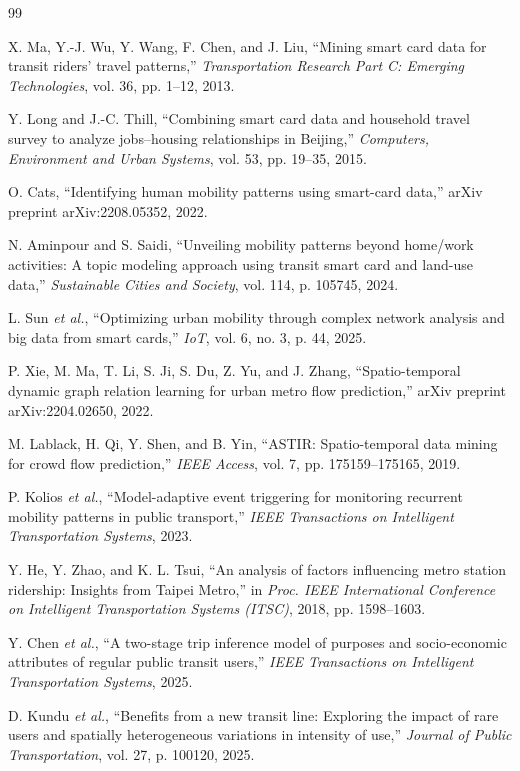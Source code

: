 \documentclass[10pt,twocolumn,a4paper]{article}
\begin{document}
\begingroup
\footnotesize
\sloppy
\begin{thebibliography}{99}

X. Ma, Y.-J. Wu, Y. Wang, F. Chen, and J. Liu, ``Mining smart card data for
transit riders' travel patterns,'' \emph{Transportation Research Part C:
Emerging Technologies}, vol. 36, pp. 1--12, 2013.

Y. Long and J.-C. Thill, ``Combining smart card data and household travel
survey to analyze jobs--housing relationships in Beijing,'' \emph{Computers,
Environment and Urban Systems}, vol. 53, pp. 19--35, 2015.

O. Cats, ``Identifying human mobility patterns using smart-card data,'' arXiv
preprint arXiv:2208.05352, 2022.

N. Aminpour and S. Saidi, ``Unveiling mobility patterns beyond home/work
activities: A topic modeling approach using transit smart card and land-use
data,'' \emph{Sustainable Cities and Society}, vol. 114, p. 105745, 2024.

L. Sun \emph{et al.}, ``Optimizing urban mobility through complex network
analysis and big data from smart cards,'' \emph{IoT}, vol. 6, no. 3, p. 44,
2025.

P. Xie, M. Ma, T. Li, S. Ji, S. Du, Z. Yu, and J. Zhang, ``Spatio-temporal
dynamic graph relation learning for urban metro flow prediction,'' arXiv
preprint arXiv:2204.02650, 2022.

M. Lablack, H. Qi, Y. Shen, and B. Yin, ``ASTIR: Spatio-temporal data mining
for crowd flow prediction,'' \emph{IEEE Access}, vol. 7, pp. 175159--175165,
2019.

P. Kolios \emph{et al.}, ``Model-adaptive event triggering for monitoring
recurrent mobility patterns in public transport,'' \emph{IEEE Transactions on
Intelligent Transportation Systems}, 2023.

Y. He, Y. Zhao, and K. L. Tsui, ``An analysis of factors influencing metro
station ridership: Insights from Taipei Metro,'' in \emph{Proc. IEEE
International Conference on Intelligent Transportation Systems (ITSC)}, 2018,
pp. 1598--1603.

Y. Chen \emph{et al.}, ``A two-stage trip inference model of purposes and
socio-economic attributes of regular public transit users,'' \emph{IEEE
Transactions on Intelligent Transportation Systems}, 2025.

D. Kundu \emph{et al.}, ``Benefits from a new transit line: Exploring the impact
of rare users and spatially heterogeneous variations in intensity of use,''
\emph{Journal of Public Transportation}, vol. 27, p. 100120, 2025.

\end{thebibliography}
\endgroup
\end{document}
